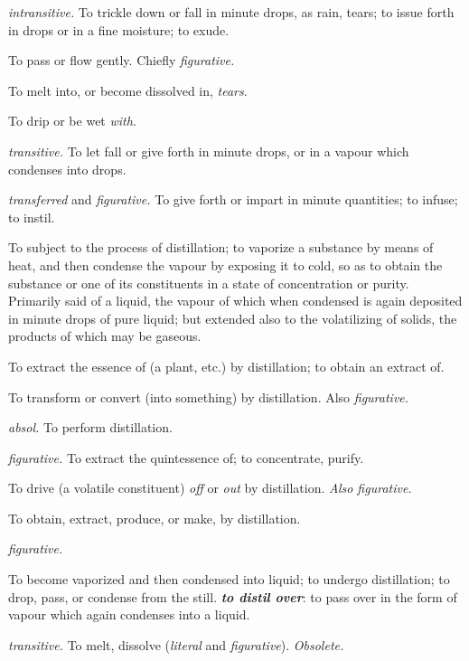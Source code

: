 			\begin{compactitem}
				\item[1.a] \textit{intransitive.} To trickle down or fall in minute drops, as rain, tears; to issue forth in drops or in a fine moisture; to exude.
				\item[1.b] To pass or flow gently. Chiefly \textit{figurative.}
				\item[1.c] To melt into, or become dissolved in, \textit{tears}.
				\item[1.d] To drip or be wet \textit{with}.
				\item[2] \textit{transitive.} To let fall or give forth in minute drops, or in a vapour which condenses into drops.
				\item[3] \textit{transferred} and \textit{figurative.} To give forth or impart in minute quantities; to infuse; to instil.
				\item[4.a] To subject to the process of distillation; to vaporize a substance by means of heat, and then condense the vapour by exposing it to cold, so as to obtain the substance or one of its constituents in a state of concentration or purity. Primarily said of a liquid, the vapour of which when condensed is again deposited in minute drops of pure liquid; but extended also to the volatilizing of solids, the products of which may be gaseous.
				\item[4.b] To extract the essence of (a plant, etc.) by distillation; to obtain an extract of.
				\item[4.c] To transform or convert (into something) by distillation. Also \textit{figurative.}
				\item[4.d] \textit{absol.} To perform distillation.
				\item[4.e] \textit{figurative.} To extract the quintessence of; to concentrate, purify.
				\item[4.f] To drive (a volatile constituent) \textit{off} or \textit{out} by distillation. \textit{Also figurative.}
				\item[5.a] To obtain, extract, produce, or make, by distillation.
				\item[5.b] \textit{figurative.}
				\item[6] To become vaporized and then condensed into liquid; to undergo distillation; to drop, pass, or condense from the still. \textit{\textbf{to distil over}}: to pass over in the form of vapour which again condenses into a liquid.
				\item[7] \textit{transitive.} To melt, dissolve (\textit{literal} and \textit{figurative}). \textit{Obsolete.}
			\end{compactitem}
			
